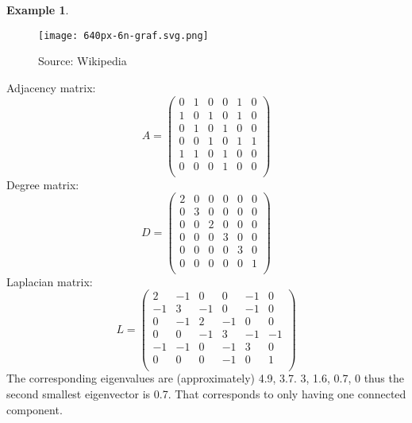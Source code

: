 \documentclass[a4paper]{article}
\theoremstyle{definition}
\newtheorem{example}{Example}
\theoremstyle{remark}
\newcommand{\source}[1]{\vspace{-3pt} \caption*{\hfill  Source: {#1}} }
\begin{document}
\begin{example}
	\begin{figure}[h!]
		\centering
		\texttt{[image: 640px-6n-graf.svg.png]}
		\caption{Example graph with 6 vertices}
		\source{Wikipedia}
		\label{fig:640px-6n-graf.png}
	\end{figure}
Adjacency matrix:
\begin{equation*}
	A= \begin{pmatrix}
	 0 &  1 &  0 &  0 &  1 &  0\\
 1 &  0 &  1 &  0 &  1 &  0\\
 0 &  1 &  0 &  1 &  0 &  0\\
 0 &  0 &  1 &  0 &  1 &  1\\
 1 &  1 &  0 &  1 &  0 &  0\\
 0 &  0 &  0 &  1 &  0 &  0\\
	\end{pmatrix}
\end{equation*}
Degree matrix:
\begin{equation*}
	D=
	\begin{pmatrix}
	 2 &  0 &  0 &  0 &  0 &  0\\
 0 &  3 &  0 &  0 &  0 &  0\\
 0 &  0 &  2 &  0 &  0 &  0\\
 0 &  0 &  0 &  3 &  0 &  0\\
 0 &  0 &  0 &  0 &  3 &  0\\
 0 &  0 &  0 &  0 &  0 &  1\\
	\end{pmatrix}
\end{equation*}
Laplacian matrix:
\begin{equation*}
	L=
	\begin{pmatrix}
	 2 & -1 &  0 &  0 & -1 &  0\\
-1 &  3 & -1 &  0 & -1 &  0\\
 0 & -1 &  2 & -1 &  0 &  0\\
 0 &  0 & -1 &  3 & -1 & -1\\
-1 & -1 &  0 & -1 &  3 &  0\\
 0 &  0 &  0 & -1 &  0 &  1\\
	\end{pmatrix}
\end{equation*}
The corresponding eigenvalues are (approximately) 4.9, 3.7. 3, 1.6, 0.7, 0
thus the second smallest eigenvector is 0.7. That corresponds to only having one connected component. 





\iffalse:
ask wolfram alpha for: 
eigenvalues
{{ 2,-1, 0, 0,-1, 0},
{-1, 3,-1, 0,-1, 0},
{ 0,-1, 2,-1, 0, 0},
{ 0, 0,-1, 3,-1,-1},
{-1,-1, 0,-1, 3, 0},
{ 0, 0, 0,-1, 0, 1}
}
\fi 

\end{example}
\end{document}
